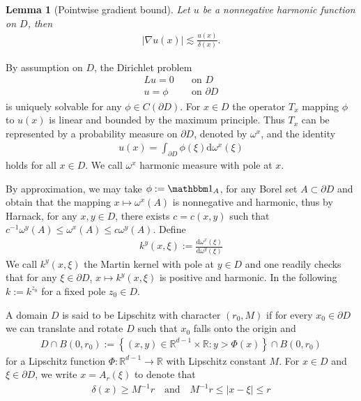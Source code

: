 \documentclass[a4paper,12pt]{article}
\newtheorem{lemma}[theorem]{Lemma}
\theoremstyle{definition}
\theoremstyle{definition}
\begin{document}
	\begin{lemma}[Pointwise gradient bound]\label{lem:GradientBound}
		Let $u$ be a nonnegative harmonic function on $D$, then
		\begin{align*}
			|\nabla u(x)|\lesssim\frac{u(x)}{\delta(x)}.
		\end{align*}
	\end{lemma}
	By assumption on $D$, the Dirichlet problem
	\begin{align*}
		Lu=0\quad&\text{on } D\\
		u=\phi\quad&\text{on } \partial D	
	\end{align*}
	is uniquely solvable for any $\phi\in C(\partial D)$. For $x\in D$ the operator $T_x$ mapping $\phi$ to $u(x)$ is linear and bounded by the maximum principle. Thus $T_x$ can be represented by a probability measure on $\partial D$, denoted by $\omega^x$, and the identity
	\begin{align*}
		u(x)=\int_{\partial D}\phi(\xi)\mathrm{d}\omega^x(\xi)
	\end{align*}
	holds for all $x\in D$. We call $\omega^x$ harmonic measure with pole at $x$. 
	\par 
	By approximation, we may take $\phi:=\mathbbm1_A$, for any Borel set $A\subset\partial D$ and obtain that the mapping $x\mapsto\omega^x(A)$ is nonnegative and harmonic, thus by Harnack, for any $x,y\in D$, there exists $c=c(x,y)$ such that $c^{-1}\omega^y(A)\leq\omega^x(A)\leq c\omega^y(A)$. Define 
	\begin{align*}
		k^{y}(x,\xi):=\frac{\mathrm{d}\omega^x(\xi)}{\mathrm d\omega^y(\xi)}
	\end{align*}
	We call $k^{y}(x,\xi)$ the Martin kernel with pole at $y\in D$ and one readily checks that for any $\xi\in\partial D$, $x\mapsto k^y(x,\xi)$ is positive and harmonic.  In the following $k:=k^{z_0}$ for a fixed pole $z_0\in D$.\par 
	A domain $D$ is said to be Lipschitz with character $(r_0,M)$ if for every $x_0\in\partial D$ we can translate and rotate $D$ such that $x_0$ falls onto the origin and 
	\begin{align*}
		D\cap B(0,r_0):=\left\lbrace (x,y)\in\mathbb R^{d-1}\times\mathbb R:y>\Phi(x)\right\rbrace\cap B(0,r_0)
	\end{align*}
	for a Lipschitz function $\Phi:\mathbb R^{d-1}\rightarrow \mathbb R$ with Lipschitz constant $M$.
	For $x\in D$ and $\xi\in\partial D$, we write $x=A_r(\xi)$ to denote that
	\begin{align}\label{eq:ArQ}
		\delta(x)\geq M^{-1}r \quad\text{and}\quad M^{-1}r\leq|x-\xi|\leq r
	\end{align}
\end{document}
